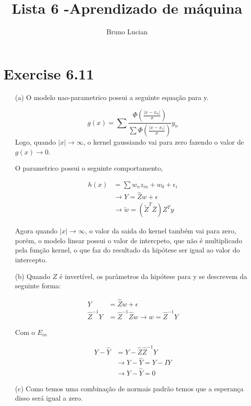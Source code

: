 \documentclass{article}
\title{Lista 6 -Aprendizado de máquina}
\author{Bruno Lucian}
\begin{document}


\maketitle

\section*{Exercise 6.11}

\begin{itemize}
\item[(a)] O modelo nao-parametrico possui a seguinte equação para y.

\begin{equation}
g(x)=\sum\frac{\Phi(\frac{|x-x_{n}|}{\sigma})}{\sum\Phi(\frac{|x-x_{i}|}{\sigma})}y_{n}
\end{equation}
Logo, quando $|x| \to \infty$, o kernel gaussiando vai para zero fazendo o valor de $g(x) \to 0$.


O parametrico possui o seguinte comportamento,

\begin{align*}
h(x)&=\sum w_{n}z_{in}+w_{0}+\epsilon_{i} \\
&\rightarrow Y=\hat{Z}w+\epsilon \\
&\to \tilde{w}=(\tilde{Z}^{T}\overline{Z})Z^{T}y
\end{align*}

Agora quando $|x| \to \infty$, o valor da saida do kernel também vai para zero, porém, o modelo linear possui o valor de intercpeto, que não é multiplicado pela função kernel, o que faz do resultado da hipótese ser igual ao valor do intercepto.

\item[(b)] Quando $Z$ é invertível, os parâmetros da hipótese para y se descrevem da seguinte forma:

\begin{align*}
Y&=\hat{Z}w+\epsilon \\
\hat{Z}^{-1}Y&=\hat{Z}^{-1}\hat{Z}w\rightarrow w=\hat{Z}^{-1}Y
\end{align*}

Com o  $E_{in}$ 

\begin{align*}
Y-\hat{Y}&=Y-\hat{Z}\hat{Z}^{-1}Y\\ 
&\rightarrow Y-\hat{Y}=Y-IY \\ 
&\rightarrow Y-\hat{Y}=0
\end{align*}

\item[(c)] Como temos uma combinação de normais padrão temos que a esperança disso será igual a zero.  

\end{itemize}
\end{document}
